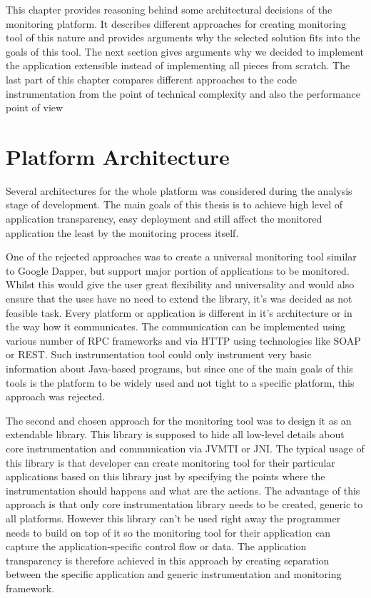 This chapter provides reasoning behind some architectural decisions of the monitoring platform. It describes different approaches for creating monitoring tool of this nature and provides arguments why the selected solution fits into the goals of this tool. The next section gives arguments why we decided to implement the application extensible instead of implementing all pieces from scratch. The last part of this chapter compares different approaches to the code instrumentation from the point of technical complexity and also the performance point of view

\section{Platform Architecture}
Several architectures for the whole platform was considered during the analysis stage of development. The main goals of this thesis is to achieve high level of application transparency, easy deployment and still affect the monitored application the least by the monitoring process itself.

One of the rejected approaches was to create a universal monitoring tool similar to Google Dapper, but support major portion of applications to be monitored. Whilst this would give the user great flexibility and universality and would also ensure that the uses have no need to extend the library, it's was decided as not feasible task. Every platform or application is different in it's architecture or in the way how it communicates. The communication can be implemented using various number of RPC frameworks and via HTTP using technologies like SOAP or REST.
Such instrumentation tool could only instrument very basic information about Java-based programs, but since one of the main goals of this tools is the platform to be widely used and not tight to a specific platform, this approach was rejected.

The second and chosen approach for the monitoring tool was to design it as an extendable library. This library is supposed to hide all low-level details about core instrumentation and communication via JVMTI or JNI. The typical usage of this library is that developer can create monitoring tool for their particular applications based on this library just by specifying the points where the instrumentation should happens and what are the actions. The advantage of this approach is that only core instrumentation library needs to be created, generic to all platforms. However this library can't be used right away the programmer needs to build on top of it  so the monitoring tool for their application can capture the application-specific control flow or data. The application transparency is therefore achieved in this approach by creating separation between the specific application and generic instrumentation and monitoring framework.

